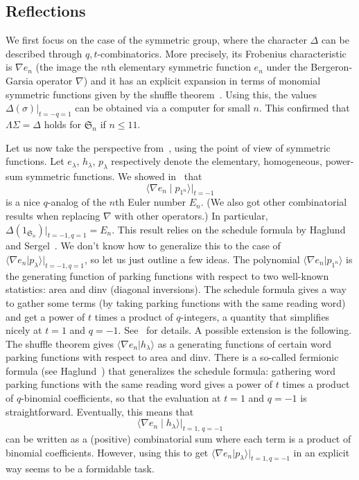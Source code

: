 \documentclass[11pt]{article}
\theoremstyle{definition}
\begin{document}
\subsection{Reflections}

We first focus on the case of the symmetric group, where the character $\varDelta$ can be described through $q,t$-combinatorics.  More precisely, its Frobenius characteristic is $\nabla e_n$ (the image the $n$th elementary symmetric function $e_n$ under the Bergeron-Garsia operator $\nabla$) and it has an explicit expansion in terms of monomial symmetric functions given by the shuffle theorem~\cite{carlssonmellit}.  Using this, the values $\varDelta(\sigma)\vert_{t=-q=1}$ can be obtained via a computer for small $n$.  This confirmed that $\Lambda\Sigma = \Delta$ holds for $\mathfrak{S}_n$ if $n\leq 11$.

Let us now take the perspective from~\cite{corteeljosuatvergesvandenwyngaerd}, using the point of view of symmetric functions.  Let $e_\lambda$, $h_\lambda$, $p_\lambda$ respectively denote the elementary, homogeneous, power-sum symmetric functions.  We showed in~\cite{corteeljosuatvergesvandenwyngaerd} that
\[
    \langle \nabla e_n \mathrel{|} p_{1^n} \rangle \big\vert_{t=-1}
\]
is a nice $q$-analog of the $n$th Euler number $E_n$. (We also got other combinatorial results when replacing $\nabla$ with other operators.)  In particular, $\varDelta(1_{\mathfrak{S}_n})\big\vert_{t=-1,q=1} = E_n$.  This result relies on the schedule formula by Haglund and Sergel~\cite{haglundsergel}.  We don't know how to generalize this to the case of $\langle \nabla e_n | p_{\lambda} \rangle \big\vert_{t=-1,q=1}$, so let us just outline a few ideas. The polynomial $\langle \nabla e_n | p_{1^n} \rangle$ is the generating function of parking functions with respect to two well-known statistics: area and dinv (diagonal inversions).  The schedule formula gives a way to gather some terms (by taking parking functions with the same reading word) and get a power of $t$ times a product of $q$-integers, a quantity that simplifies nicely at $t=1$ and $q=-1$.  See~\cite{corteeljosuatvergesvandenwyngaerd,haglundsergel} for details.  A possible extension is the following.  The shuffle theorem gives $\langle \nabla e_n | h_{\lambda} \rangle$ as a generating functions of certain word parking functions with respect to area and dinv.  There is a so-called fermionic formula (see Haglund~\cite{haglund}) that generalizes the schedule formula: gathering word parking functions with the same reading word gives a power of $t$ times a product of $q$-binomial coefficients, so that the evaluation at $t=1$ and $q=-1$ is straightforward.  Eventually, this means that  
\[
    \langle \nabla e_n \mathrel{|} h_{\lambda} \rangle \big\vert_{t=1,\,q=-1}
\]
can be written as a (positive) combinatorial sum where each term is a product of binomial coefficients.  However, using this to get $\langle \nabla e_n | p_{\lambda} \rangle \big\vert_{t=1,q=-1}$ in an explicit way seems to be a formidable task.
\end{document}
